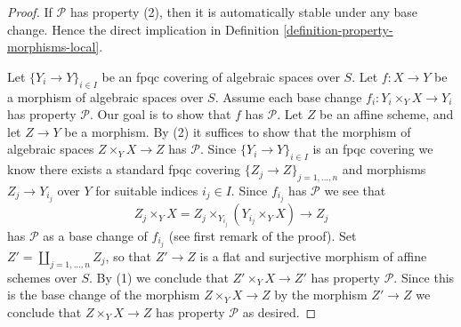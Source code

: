 \documentclass[10pt,a4paper]{amsart}
\theoremstyle{plain}
\theoremstyle{definition}
\theoremstyle{remark}
\numberwithin{equation}{subsection}
\begin{document}
\begin{proof}
If $\mathcal{P}$ has property (2), then it is automatically
stable under any base change. Hence the direct implication in
Definition \ref{definition-property-morphisms-local}.

\medskip\noindent
Let $\{Y_i \to Y\}_{i \in I}$ be an fpqc covering of algebraic spaces over $S$.
Let $f : X \to Y$ be a morphism of algebraic spaces over $S$.
Assume each base change $f_i : Y_i \times_Y X \to Y_i$ has property
$\mathcal{P}$. Our goal is to show that $f$ has $\mathcal{P}$.
Let $Z$ be an affine scheme, and let $Z \to Y$ be a morphism.
By (2) it suffices to show that the morphism of algebraic spaces
$Z \times_Y X \to Z$ has $\mathcal{P}$.
Since $\{Y_i \to Y\}_{i \in I}$ is an fpqc covering we know there
exists a standard fpqc covering $\{Z_j \to Z\}_{j = 1, \ldots , n}$
and morphisms $Z_j \to Y_{i_j}$ over $Y$ for suitable indices $i_j \in I$.
Since $f_{i_j}$ has $\mathcal{P}$ we see that
$$
Z_j \times_Y X
=
Z_j \times_{Y_{i_j}} (Y_{i_j} \times_Y X)
\longrightarrow
Z_j
$$
has $\mathcal{P}$ as a base change of $f_{i_j}$ (see first remark of the
proof). Set $Z' = \coprod_{j = 1, \ldots, n} Z_j$, so that $Z' \to Z$ is
a flat and surjective morphism of affine schemes over $S$. By (1)
we conclude that $Z' \times_Y X \to Z'$ has property $\mathcal{P}$.
Since this is the base change of the morphism $Z \times_Y X \to Z$
by the morphism $Z' \to Z$ we conclude that
$Z \times_Y X \to Z$ has property $\mathcal{P}$ as desired.
\end{proof}
\end{document}
